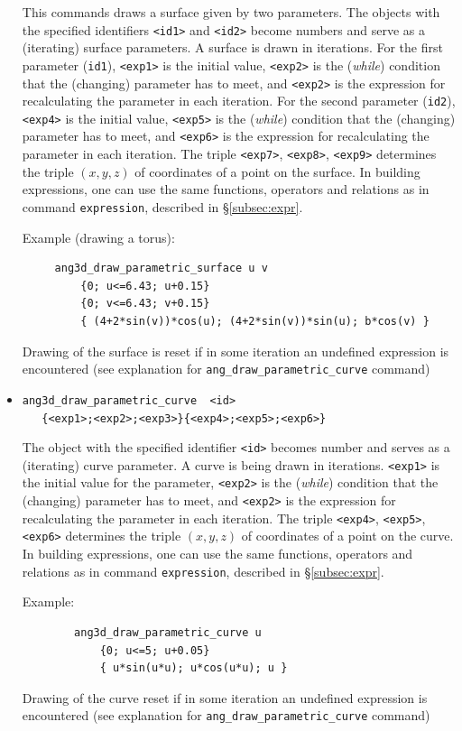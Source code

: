 \documentclass[a4paper]{book}
\begin{document}
\begin{itemize}
        This commands draws a surface given by two parameters. The objects with
        the specified identifiers \verb|<id1>| and \verb|<id2>| become
        {\sc number}s and serve as a (iterating) surface parameters.
        A surface is drawn in iterations. For the first parameter (\verb|id1|),
        \verb|<exp1>| is the initial value, \verb|<exp2>| is the ({\em while})
        condition that the (changing) parameter has to meet, and \verb|<exp2>|
        is the expression for recalculating the parameter in each iteration.
        For the second parameter (\verb|id2|),
        \verb|<exp4>| is the initial value, \verb|<exp5>| is the ({\em while})
        condition that the (changing) parameter has to meet, and \verb|<exp6>|
        is the expression for recalculating the parameter in each iteration.
        The triple \verb|<exp7>|, \verb|<exp8>|, \verb|<exp9>| determines the
        triple $(x,y,z)$ of coordinates of a point on the surface. In building
        expressions, one can use the same functions, operators and relations as
        in command \verb|expression|, described in \S\ref{subsec:expr}.

        Example (drawing a torus):
        \begin{verbatim}
     ang3d_draw_parametric_surface u v
         {0; u<=6.43; u+0.15}
         {0; v<=6.43; v+0.15}
         { (4+2*sin(v))*cos(u); (4+2*sin(v))*sin(u); b*cos(v) }
        \end{verbatim}
        Drawing of the surface is reset if in some iteration an undefined expression is
        encountered (see explanation for \verb|ang_draw_parametric_curve| command)

\item
\verb|ang3d_draw_parametric_curve  <id>| \\
\verb|   {<exp1>;<exp2>;<exp3>}{<exp4>;<exp5>;<exp6>}|

        The object with the specified identifier \verb|<id>| becomes
        {\sc number} and serves as a (iterating) curve parameter. A curve is being drawn
        in iterations. \verb|<exp1>| is the initial value for the parameter,
        \verb|<exp2>| is the ({\em while}) condition that the (changing)
        parameter has to meet, and \verb|<exp2>| is the expression for
        recalculating the parameter in each iteration. The triple \verb|<exp4>|,
        \verb|<exp5>|,\verb|<exp6>| determines the triple $(x,y,z)$ of coordinates of
        a point on the curve. In building expressions, one can use the same functions,
        operators and relations as in command \verb|expression|,
        described in \S\ref{subsec:expr}.

        Example:
        \begin{verbatim}
        ang3d_draw_parametric_curve u
            {0; u<=5; u+0.05}
            { u*sin(u*u); u*cos(u*u); u }
        \end{verbatim}
        Drawing of the curve reset if in some iteration an undefined expression is
        encountered (see explanation for \verb|ang_draw_parametric_curve| command)
\end{itemize}
\end{document}
